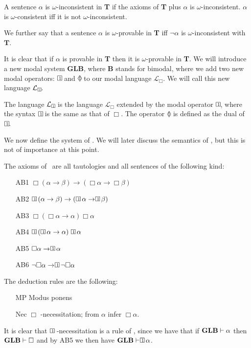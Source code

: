 \documentclass[../main.tex]{subfiles}
\begin{document}
\begin{defi}
	A sentence $\alpha$ is $\omega$-inconsistent in \textbf{T} if the
	axioms of \textbf{T} plus $\alpha$ is $\omega$-inconsistent. $\alpha$
	is $\omega$-consistent iff it is not $\omega$-inconsistent.

	We further say that a sentence $\alpha$ is $\omega$-provable in
	\textbf{T} iff $\neg\alpha$ is $\omega$-inconsistent with $\textbf{T}$.
\end{defi}
It is clear that if $\alpha$ is provable in \textbf{T} then it is
$\omega$-provable in \textbf{T}. We will introduce a new modal system
$\textbf{GLB}$, where \textbf{B} stands for bimodal, where we add two new modal
operators: $\OneBox$ and $\OneDiamond$ to our modal language
$\mathcal{L}_\Box$. We will call this new language $\mathcal{L}_{\oneBox}$.
\begin{defi}
	The language $\mathcal{L}_{\oneBox}$ is the language $\mathcal{L}_\Box$
	extended by the modal operator $\OneBox$, where the syntax $\OneBox$ is
	the same as that of $\Box$. The operator $\OneDiamond$ is defined as
	the dual of $\OneBox$.
\end{defi}
We now define the system of \GLB. We will later discuss the semantics of
\GLB, but this is not of importance at this point.

\begin{defi}
	The axioms of \GLB\ are all tautologies and all sentences of the
	following kind:
	\begin{enumerate}
		\item[AB1]
			$\Box(\alpha\rightarrow\beta)\rightarrow(\Box\alpha\rightarrow\Box\beta)$
		\item[AB2]
			$\OneBox(\alpha\rightarrow\beta)\rightarrow(\OneBox\alpha\rightarrow\OneBox\beta)$
		\item[AB3] $\Box(\Box\alpha\rightarrow\alpha)\Box\alpha$
		\item[AB4] $\OneBox(\OneBox\alpha\rightarrow\alpha)\OneBox\alpha$
		\item[AB5] $\Box\alpha\rightarrow\OneBox\alpha$
		\item[AB6] $\neg\Box\alpha\rightarrow\OneBox\neg\Box\alpha$
	\end{enumerate}
	The deduction rules are the following:
	\begin{enumerate}
		\item[MP] Modus ponens
		\item[Nec] $\Box$  -necessitation; from $\alpha$ infer
			$\Box\alpha$.
	\end{enumerate}
\end{defi}
It is clear that $\OneBox$ -necessitation is a rule of \GLB, since we have that
if $\text{\textbf{GLB}}\vdash\alpha$ then $\text{\textbf{GLB}}\vdash\Box$ and by AB5 we then have
$\GLB\vdash\OneBox\alpha$.
\end{document}
